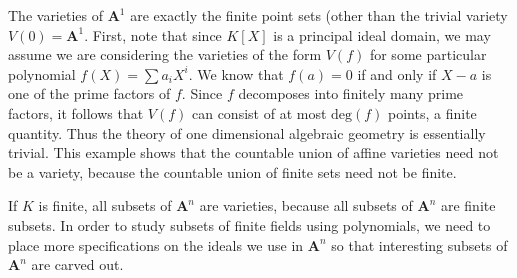 \begin{example}
    The varieties of $\mathbf{A}^1$ are exactly the finite point sets (other than the trivial variety $V(0) = \mathbf{A}^1$. First, note that since $K[X]$ is a principal ideal domain, we may assume we are considering the varieties of the form $V(f)$ for some particular polynomial $f(X) = \sum a_i X^i$. We know that $f(a) = 0$ if and only if $X - a$ is one of the prime factors of $f$. Since $f$ decomposes into finitely many prime factors, it follows that $V(f)$ can consist of at most $\text{deg}(f)$ points, a finite quantity. Thus the theory of one dimensional algebraic geometry is essentially trivial. This example shows that the countable union of affine varieties need not be a variety, because the countable union of finite sets need not be finite.
\end{example}

\begin{example}
    If $K$ is finite, all subsets of $\mathbf{A}^n$ are varieties, because all subsets of $\mathbf{A}^n$ are finite subsets. In order to study subsets of finite fields using polynomials, we need to place more specifications on the ideals we use in $\mathbf{A}^n$ so that interesting subsets of $\mathbf{A}^n$ are carved out.
\end{example}


